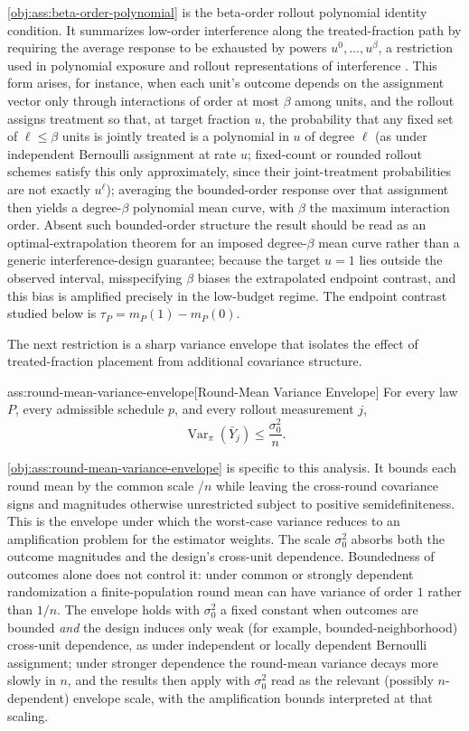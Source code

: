 \documentclass[11pt]{article}
\begin{document}
\cref{obj:ass:beta-order-polynomial} is the beta-order rollout polynomial identity condition. It summarizes low-order interference along the treated-fraction path by requiring the average response to be exhausted by powers \(u^0,\ldots,u^\beta\), a restriction used in polynomial exposure and rollout representations of interference \citep{cortez2022}. This form arises, for instance, when each unit's outcome depends on the assignment vector only through interactions of order at most \(\beta\) among units, and the rollout assigns treatment so that, at target fraction \(u\), the probability that any fixed set of \(\ell\le\beta\) units is jointly treated is a polynomial in \(u\) of degree \(\ell\) (as under independent Bernoulli assignment at rate \(u\); fixed-count or rounded rollout schemes satisfy this only approximately, since their joint-treatment probabilities are not exactly \(u^\ell\)); averaging the bounded-order response over that assignment then yields a degree-\(\beta\) polynomial mean curve, with \(\beta\) the maximum interaction order. Absent such bounded-order structure the result should be read as an optimal-extrapolation theorem for an imposed degree-\(\beta\) mean curve rather than a generic interference-design guarantee; because the target \(u=1\) lies outside the observed interval, misspecifying \(\beta\) biases the extrapolated endpoint contrast, and this bias is amplified precisely in the low-budget regime. The endpoint contrast studied below is \(\tau_P=m_P(1)-m_P(0)\).

The next restriction is a sharp variance envelope that isolates the effect of treated-fraction placement from additional covariance structure.

\begin{assumptionv}{ass:round-mean-variance-envelope}[Round-Mean Variance Envelope]
For every law \(P\), every admissible schedule \(p\), and every rollout measurement \(j\),
\[
\operatorname{Var}_\pi(\bar Y_j)\le \frac{\sigma_0^2}{n}.
\]
\end{assumptionv}

\cref{obj:ass:round-mean-variance-envelope} is specific to this analysis. It bounds each round mean by the common scale /\(n\) while leaving the cross-round covariance signs and magnitudes otherwise unrestricted subject to positive semidefiniteness. This is the envelope under which the worst-case variance reduces to an amplification problem for the estimator weights. The scale \(\sigma_0^2\) absorbs both the outcome magnitudes and the design's cross-unit dependence. Boundedness of outcomes alone does not control it: under common or strongly dependent randomization a finite-population round mean can have variance of order \(1\) rather than \(1/n\). The envelope holds with \(\sigma_0^2\) a fixed constant when outcomes are bounded \emph{and} the design induces only weak (for example, bounded-neighborhood) cross-unit dependence, as under independent or locally dependent Bernoulli assignment; under stronger dependence the round-mean variance decays more slowly in \(n\), and the results then apply with \(\sigma_0^2\) read as the relevant (possibly \(n\)-dependent) envelope scale, with the amplification bounds interpreted at that scaling.
\end{document}
